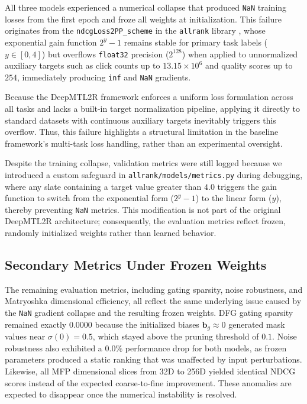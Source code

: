All three models experienced a numerical collapse that produced \texttt{NaN} training losses from the first epoch and froze all weights at initialization. This failure originates from the \texttt{ndcgLoss2PP\_scheme} in the \texttt{allrank} library \cite{wang2018lambdaloss}, whose exponential gain function $2^{y}-1$ remains stable for primary task labels ($y \in [0,4]$) but overflows \texttt{float32} precision ($2^{128}$) when applied to unnormalized auxiliary targets such as click counts up to $13.15 \times 10^{6}$ and quality scores up to $254$, immediately producing \texttt{inf} and \texttt{NaN} gradients.

Because the DeepMTL2R framework enforces a uniform loss formulation across all tasks and lacks a built-in target normalization pipeline, applying it directly to standard datasets with continuous auxiliary targets inevitably triggers this overflow. Thus, this failure highlights a structural limitation in the baseline framework's multi-task loss handling, rather than an experimental oversight.

Despite the training collapse, validation metrics were still logged because we introduced a custom safeguard in \texttt{allrank/models/metrics.py} during debugging, where any slate containing a target value greater than $4.0$ triggers the gain function to switch from the exponential form ($2^{y}-1$) to the linear form ($y$), thereby preventing \texttt{NaN} metrics. This modification is not part of the original DeepMTL2R architecture; consequently, the evaluation metrics reflect frozen, randomly initialized weights rather than learned behavior.

\subsection{Secondary Metrics Under Frozen Weights}

The remaining evaluation metrics, including gating sparsity, noise robustness, and Matryoshka dimensional efficiency, all reflect the same underlying issue caused by the \texttt{NaN} gradient collapse and the resulting frozen weights. DFG gating sparsity remained exactly $0.0000$ because the initialized biases $\mathbf{b}_g \approx 0$ generated mask values near $\sigma(0) = 0.5$, which stayed above the pruning threshold of $0.1$. Noise robustness also exhibited a $0.0\%$ performance drop for both models, as frozen parameters produced a static ranking that was unaffected by input perturbations. Likewise, all MFP dimensional slices from 32D to 256D yielded identical NDCG scores instead of the expected coarse-to-fine improvement. These anomalies are expected to disappear once the numerical instability is resolved.